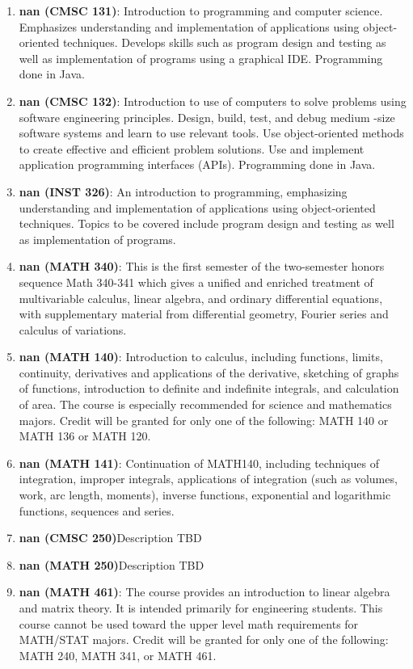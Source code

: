 \begin{enumerate}
\item \textbf{nan (CMSC 131)}: Introduction to programming and computer science. Emphasizes understanding and implementation of applications using object-oriented techniques. Develops skills such as program design and testing as well as implementation of programs using a graphical IDE. Programming done in Java.
\item \textbf{nan (CMSC 132)}: Introduction to use of computers to solve problems using software engineering principles. Design, build, test, and debug medium -size software systems and learn to use relevant tools. Use object-oriented methods to create effective and efficient problem solutions. Use and implement application programming interfaces (APIs). Programming done in Java.
\item \textbf{nan (INST 326)}: An introduction to programming, emphasizing understanding and
implementation of applications using object-oriented techniques. Topics to
be covered include program design and testing as well as implementation of
programs.
\item \textbf{nan (MATH 340)}: This is the first semester of the two-semester honors sequence Math 340-341 which gives a unified and enriched treatment of multivariable calculus, linear algebra, and ordinary differential equations, with supplementary material from differential geometry, Fourier series and calculus of variations.
\item \textbf{nan (MATH 140)}: Introduction to calculus, including functions, limits, continuity, derivatives and applications of the derivative, sketching of graphs of functions, introduction to definite and indefinite integrals, and calculation of area. The course is especially recommended for science and mathematics majors. Credit will be granted for only one of the following: MATH 140 or MATH 136 or MATH 120.
\item \textbf{nan (MATH 141)}: Continuation of MATH140, including techniques of integration, improper integrals, applications of integration (such as volumes, work, arc length, moments), inverse functions, exponential and logarithmic functions, sequences and series.
\item \textbf{nan (CMSC 250)}Description TBD
\item \textbf{nan (MATH 250)}Description TBD
\item \textbf{nan (MATH 461)}: The course provides an introduction to linear algebra and matrix theory. It is intended primarily for engineering students. This course cannot be used toward the upper level math requirements for MATH/STAT majors. Credit will be granted for only one of the following: MATH 240, MATH 341, or MATH 461.

\end{enumerate}
